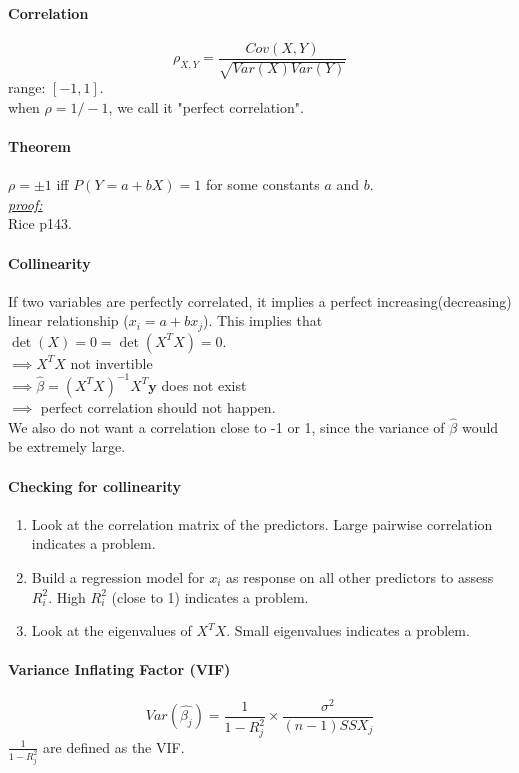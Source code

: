 \documentclass[11pt]{article}
\newcommand{\tb}[1]{\textbf{#1}}
\newcommand{\proof}[0]{\textit{\underline{proof:} }}
\newcommand{\vy}[0]{\tb{y}}
\begin{document}
\paragraph{Correlation}
$$\rho_{X,Y} = \frac{Cov(X, Y)}{\sqrt{Var(X)Var(Y)}}$$
range: $[-1, 1]$.\\
when $\rho = 1/-1$, we call it "perfect correlation".
\paragraph{Theorem}
$\rho = \pm 1$ iff $P(Y = a + bX) = 1$ for some constants $a$ and $b$. \\
\proof \\
Rice p143.
\paragraph{Collinearity}
If two variables are perfectly correlated, it implies a perfect increasing(decreasing) linear relationship ($x_i = a+ bx_j$). This implies that $\det(X) = 0 = \det(X^TX) = 0$.\\
$\implies X^TX$ not invertible \\
$\implies \hat{\beta} = (X^TX)^{-1}X^T\vy$ does not exist \\
$\implies$ perfect correlation should not happen. \\
We also do not want a correlation close to -1 or 1, since the variance of $\hat{\beta}$ would be extremely large.
\paragraph{Checking for collinearity}
\begin{enumerate}
	\item Look at the correlation matrix of the predictors. Large pairwise correlation indicates a problem.
	\item Build a regression model for $x_i$ as response on all other predictors to assess $R_i^2$. High $R_i^2$ (close to 1) indicates a problem.
	\item Look at the eigenvalues of $X^TX$. Small eigenvalues indicates a problem.
\end{enumerate}

\paragraph{Variance Inflating Factor (VIF)}
$$Var(\hat{\beta_j}) = \frac{1}{1-R_j^2} \times \frac{\sigma^2}{(n-1)SSX_j}$$
$\frac{1}{1-R_j^2}$ are defined as the VIF.
\end{document}
